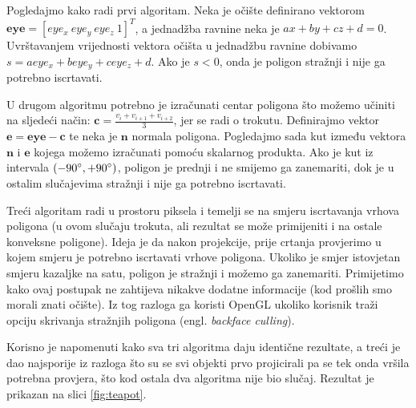 \documentclass[a4paper,12pt]{article}
\begin{document}
Pogledajmo kako radi prvi algoritam. Neka je očište definirano vektorom
$\mathbf{eye} = [eye_x\ eye_y\ eye_z\ 1]^T$, a jednadžba ravnine neka je
$ax + by + cz + d = 0$. Uvrštavanjem vrijednosti vektora očišta u jednadžbu
ravnine dobivamo $s = a{eye_x} + b{eye_y} + c{eye_z} + d$. Ako je $s < 0$, onda je
poligon stražnji i nije ga potrebno iscrtavati.

U drugom algoritmu potrebno je izračunati centar poligona što možemo učiniti
na sljedeći način: $\mathbf{c} = \frac{v_i+v_{i+1}+v_{i+2}}{3}$, jer se radi
o trokutu. Definirajmo vektor $\mathbf{e} = \mathbf{eye} - \mathbf{c}$ te
neka je $\mathbf{n}$ normala poligona. Pogledajmo sada kut između vektora
$\mathbf{n}$ i $\mathbf{e}$ kojega možemo izračunati pomoću skalarnog produkta. Ako je kut iz intervala $(-90\degree, +90\degree)$, poligon je prednji i
ne smijemo ga zanemariti, dok je u ostalim slučajevima stražnji i nije ga potrebno
iscrtavati.

Treći algoritam radi u prostoru piksela i temelji se na smjeru iscrtavanja
vrhova poligona (u ovom slučaju trokuta, ali rezultat se može primijeniti i
na ostale konveksne poligone). Ideja je da nakon projekcije, prije crtanja
provjerimo u kojem smjeru je potrebno iscrtavati vrhove poligona. Ukoliko je
smjer istovjetan smjeru kazaljke na satu, poligon je stražnji i možemo ga
zanemariti. Primijetimo kako ovaj postupak ne zahtijeva nikakve dodatne
informacije (kod prošlih smo morali znati očište). Iz tog razloga ga koristi
OpenGL ukoliko korisnik traži opciju skrivanja stražnjih poligona (engl.
{\sl backface culling}).

Korisno je napomenuti kako sva tri algoritma daju identične rezultate, a
treći je dao najsporije iz razloga što su se svi objekti prvo projicirali pa
se tek onda vršila potrebna provjera, što kod ostala dva algoritma nije bio
slučaj. Rezultat je prikazan na slici \ref{fig:teapot}.
\end{document}
